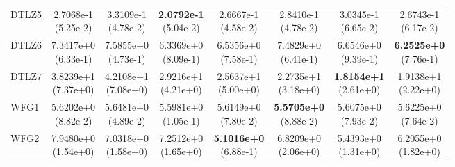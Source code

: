 \begin{table}[p]
\begin{tabular}{lccccccc}
DTLZ5 & \shortstack{2.7068e-1\\(5.25e-2)} & \shortstack{3.3109e-1\\(4.78e-2)} & \shortstack{\textbf{2.0792e-1}\\(5.04e-2)} & \shortstack{2.6667e-1\\(4.58e-2)} & \shortstack{2.8410e-1\\(4.78e-2)} & \shortstack{3.0345e-1\\(6.65e-2)} & \shortstack{2.6743e-1\\(6.17e-2)} \\
DTLZ6 & \shortstack{7.3417e+0\\(6.33e-1)} & \shortstack{7.5855e+0\\(4.73e-1)} & \shortstack{6.3369e+0\\(8.09e-1)} & \shortstack{6.5356e+0\\(7.58e-1)} & \shortstack{7.4829e+0\\(6.41e-1)} & \shortstack{6.6546e+0\\(9.39e-1)} & \shortstack{\textbf{6.2525e+0}\\(7.76e-1)} \\
DTLZ7 & \shortstack{3.8239e+1\\(7.37e+0)} & \shortstack{4.2108e+1\\(7.08e+0)} & \shortstack{2.9216e+1\\(4.21e+0)} & \shortstack{2.5637e+1\\(5.00e+0)} & \shortstack{2.2735e+1\\(3.18e+0)} & \shortstack{\textbf{1.8154e+1}\\(2.61e+0)} & \shortstack{1.9138e+1\\(2.22e+0)} \\
WFG1 & \shortstack{5.6202e+0\\(8.82e-2)} & \shortstack{5.6481e+0\\(4.89e-2)} & \shortstack{5.5981e+0\\(1.05e-1)} & \shortstack{5.6149e+0\\(7.80e-2)} & \shortstack{\textbf{5.5705e+0}\\(8.88e-2)} & \shortstack{5.6075e+0\\(7.93e-2)} & \shortstack{5.6225e+0\\(7.64e-2)} \\
WFG2 & \shortstack{7.9480e+0\\(1.54e+0)} & \shortstack{7.0318e+0\\(1.58e+0)} & \shortstack{7.2512e+0\\(1.65e+0)} & \shortstack{\textbf{5.1016e+0}\\(6.88e-1)} & \shortstack{6.8209e+0\\(2.06e+0)} & \shortstack{5.4393e+0\\(1.31e+0)} & \shortstack{6.2055e+0\\(1.82e+0)} \\

\end{tabular}
\end{table}
